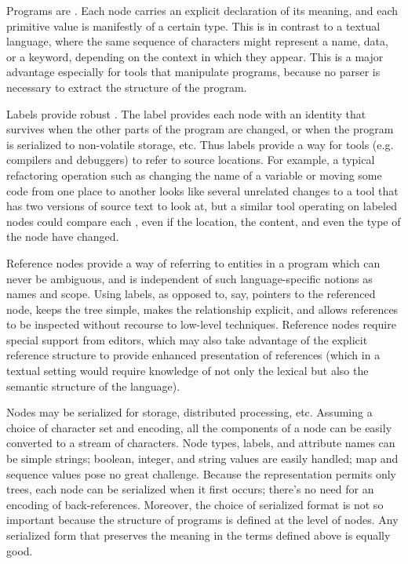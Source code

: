 Programs are . Each node carries an explicit declaration of its meaning, and each primitive value is manifestly of a certain type. This is in contrast to a textual language, where the same sequence of characters might represent a name, data, or a keyword, depending on the context in which they appear. This is a major advantage especially for tools that manipulate programs, because no parser is necessary to extract the structure of the program.

Labels provide robust . The label provides each node with an identity that survives when the other parts of the program are changed, or when the program is serialized to non-volatile storage, etc. Thus labels provide a way for tools (e.g. compilers and debuggers) to refer to source locations. For example, a typical refactoring operation such as changing the name of a variable or moving some code from one place to another looks like several unrelated changes to a  tool that has two versions of source text to look at, but a similar tool operating on labeled nodes could compare each , even if the location, the content, and even the type of the node have changed.

Reference nodes provide a way of referring to entities in a program which can never be ambiguous, and is independent of such language-specific notions as names and scope. Using labels, as opposed to, say, pointers to the referenced node, keeps the tree simple, makes the relationship explicit, and allows references to be inspected without recourse to low-level techniques. Reference nodes require special support from editors, which may also take advantage of the explicit reference structure to provide enhanced presentation of references (which in a textual setting would require knowledge of not only the lexical but also the semantic structure of the language).

Nodes may be serialized for storage, distributed processing, etc. Assuming a choice of character set and encoding, all the components of a node can be easily converted to a stream of characters. Node types, labels, and attribute names can be simple strings; boolean, integer, and string values are easily handled; map and sequence values pose no great challenge. Because the representation permits only trees, each node can be serialized when it first occurs; there's no need for an encoding of back-references. Moreover, the choice of serialized format is not so important because the structure of programs is defined at the level of nodes. Any serialized form that preserves the meaning in the terms defined above is equally good.

